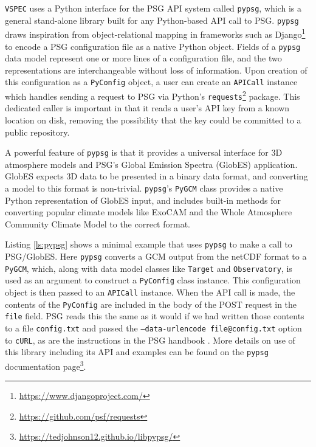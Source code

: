 \documentclass[twocolumn,linenumbers]{aastex631}
\newcommand{\vspec}[1]{\texttt{VSPEC}#1}
\newcommand{\urldocslibpypsg}{\url{https://tedjohnson12.github.io/libpypsg/}}
\begin{document}
\vspec{} uses a Python interface for the PSG API system called \texttt{pypsg}, which is a general stand-alone library built for any Python-based API call to PSG. \texttt{pypsg} draws inspiration from object-relational mapping in frameworks such as Django\footnote{\url{https://www.djangoproject.com/}} to encode a PSG configuration file as a native Python object. Fields of a \texttt{pypsg} data model represent one or more lines of a configuration file, and the two representations are interchangeable without loss of information. Upon creation of this configuration as a \texttt{PyConfig} object, a user can create an \texttt{APICall} instance which handles sending a request to PSG via Python's \texttt{requests}\footnote{\url{https://github.com/psf/requests}} package. This dedicated caller is important in that it reads a user's API key from a known location on disk, removing the possibility that the key could be committed to a public repository.

A powerful feature of \texttt{pypsg} is that it provides a universal interface for 3D atmosphere models and PSG's Global Emission Spectra (GlobES) application.
GlobES expects 3D data to be presented in a binary data format, and converting a model to this format is non-trivial. \texttt{pypsg}'s \texttt{PyGCM} class provides a native Python representation of GlobES input, and includes built-in methods for converting popular climate models like ExoCAM \citep{wolf2022} and the Whole Atmosphere Community Climate Model \citep[WACCM,][]{marsh2013} to the correct format.

Listing \ref{ls:pypsg} shows a minimal example that uses \texttt{pypsg} to make a call to PSG/GlobES. Here \texttt{pypsg} converts a GCM output from the netCDF format to a \texttt{PyGCM}, which, along with data model classes like \texttt{Target} and \texttt{Observatory}, is used as an argument to construct a \texttt{PyConfig} class instance. This configuration object is then passed to an \texttt{APICall} instance. When the API call is made, the contents of the \texttt{PyConfig} are included in the body of the POST request in the \texttt{file} field. PSG reads this the same as it would if we had written those contents to a file \texttt{config.txt} and passed the \texttt{--data-urlencode file@config.txt} option to \texttt{cURL}, as are the instructions in the PSG handbook \citep[pp. 162-163]{villanueva2022}. More details on use of this library including its API and examples can be found on the \texttt{pypsg} documentation page\footnote{\urldocslibpypsg}.
\end{document}
